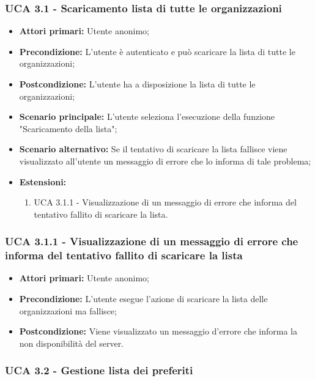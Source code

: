 \subsubsection{UCA 3.1 - Scaricamento lista di tutte le organizzazioni}%
\begin{itemize}
\item \textbf{Attori primari:} Utente anonimo;
\item \textbf{Precondizione:} L'utente è autenticato e può scaricare la lista di tutte le organizzazioni;
\item \textbf{Postcondizione:} L'utente ha a disposizione la lista di tutte le organizzazioni;
\item \textbf{Scenario principale:} L'utente seleziona l'esecuzione della funzione "Scaricamento della lista";
\item \textbf{Scenario alternativo:}  Se il tentativo di scaricare la lista fallisce viene visualizzato all'utente un messaggio di errore che lo informa di tale problema;
\item \textbf{Estensioni:}
	\begin{enumerate}
	\item UCA 3.1.1 - Visualizzazione di un messaggio di errore che informa del tentativo fallito di scaricare la lista.
\end{enumerate}
  
\end{itemize}

\subsubsection{UCA 3.1.1 - Visualizzazione di un messaggio di errore che informa del tentativo fallito di scaricare la lista}%
\begin{itemize}
\item \textbf{Attori primari:} Utente anonimo;
\item \textbf{Precondizione:} L'utente esegue l'azione di scaricare la lista delle organizzazioni ma fallisce;
\item \textbf{Postcondizione:} Viene visualizzato un messaggio d'errore che informa la non disponibilità del server.

\end{itemize}



\subsubsection{UCA 3.2 - Gestione lista dei preferiti}%

